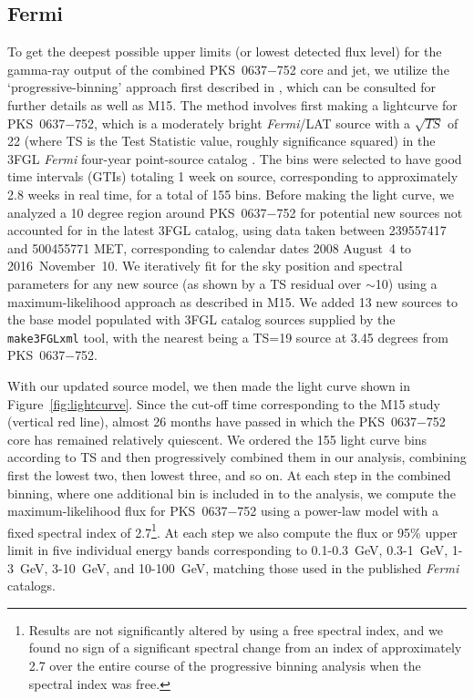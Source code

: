 \documentclass[twocolumn]{aastex61}
\begin{document}
\subsection{Fermi}
To get the deepest possible upper limits (or lowest detected flux
level) for the gamma-ray output of the combined PKS~0637$-$752 core
and jet, we utilize the `progressive-binning' approach first described
in \cite{meyer2014}, which can be consulted for further details as
well as M15. The method involves first making a lightcurve for
PKS~0637$-$752, which is a moderately bright \emph{Fermi}/LAT source
with a $\sqrt{TS}$ of 22 (where TS is the Test Statistic value,
roughly significance squared) in the 3FGL \emph{Fermi} four-year
point-source catalog \citep{4fgl}. The bins were selected to have good
time intervals (GTIs) totaling 1 week on source, corresponding to
approximately 2.8 weeks in real time, for a total of 155 bins. Before
making the light curve, we analyzed a 10 degree region around
PKS~0637$-$752 for potential new sources not accounted for in the
latest 3FGL catalog, using data taken between 239557417 and 500455771
MET, corresponding to calendar dates 2008 August~4 to
2016~November~10. We iteratively fit for the sky position and spectral
parameters for any new source (as shown by a TS residual over
$\sim$10) using a maximum-likelihood approach as described in M15. We
added 13 new sources to the base model populated with 3FGL catalog
sources supplied by the \texttt{make3FGLxml} tool, with the nearest
being a TS=19 source at 3.45 degrees from PKS~0637$-$752.

With our updated source model, we then made the light curve shown in
Figure~\ref{fig:lightcurve}. Since the cut-off time corresponding to
the M15 study (vertical red line), almost 26 months have passed in
which the PKS~0637$-$752 core has remained relatively quiescent. We
ordered the 155 light curve bins according to TS and then
progressively combined them in our analysis, combining first the
lowest two, then lowest three, and so on. At each step in the combined
binning, where one additional bin is included in to the analysis, we
compute the maximum-likelihood flux for PKS~0637$-$752 using a
power-law model with a fixed spectral index of 2.7\footnote{Results
  are not significantly altered by using a free spectral index, and we
  found no sign of a significant spectral change from an index of
  approximately 2.7 over the entire course of the progressive binning
  analysis when the spectral index was free.}. At each step we also
compute the flux or 95\% upper limit in five individual energy bands
corresponding to 0.1-0.3~GeV, 0.3-1~GeV, 1-3~GeV, 3-10~GeV, and
10-100~GeV, matching those used in the published \emph{Fermi}
catalogs.
\end{document}
